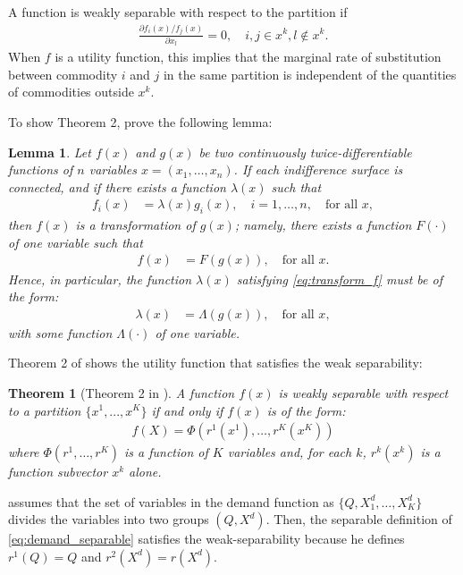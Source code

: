 \documentclass[11pt, a4paper]{article}
\newtheorem{theorem}{Theorem}
\newtheorem{lemma}{Lemma}
\theoremstyle{remark}
\begin{document}
A function is weakly separable with respect to the partition if 
\begin{align}
    \frac{\partial f_i(x)/ f_j(x)}{\partial x_l} = 0, \quad i,j\in x^k, l \notin x^k.
\end{align}
When $f$ is a utility function, this implies that the marginal rate of substitution between commodity $i$ and $j$ in the same partition is independent of the quantities of commodities outside $x^k$.

To show Theorem 2, \citet{goldmanNote1964} prove the following lemma:
\begin{lemma}\label{lemma_1_GU}
    Let $f(x)$ and $g(x)$ be two continuously twice-differentiable functions of $n$ variables $x=(x_1, \dots, x_n)$. If each indifference surface is connected, and if there exists a function $\lambda(x)$ such that
    \begin{align}
    f_i(x) &= \lambda(x)g_i(x), \quad i=1, \dots, n, \quad \text{for all } x, \label{eq:transform_f}
    \end{align}
    then $f(x)$ is a transformation of $g(x)$; namely, there exists a function $F(\cdot)$ of one variable such that
    \begin{align}
    f(x) &= F(g(x)), \quad \text{for all } x.
    \end{align}
    Hence, in particular, the function $\lambda(x)$ satisfying \eqref{eq:transform_f} must be of the form:
    \begin{align}
        \lambda(x) &= \Lambda(g(x)), \quad \text{for all } x,
    \end{align}
    with some function $\Lambda(\cdot)$ of one variable.
\end{lemma}

Theorem 2 of \citet{goldmanNote1964} shows the utility function that satisfies the weak separability:
\begin{theorem}[Theorem 2 in \citet{goldmanNote1964}]\label{thorem_2_GU}
    A function $f(x)$ is weakly separable with respect to a partition $\{x^1, .. ., x^K\}$ if and only if $f(x)$ is of the form: 
    \begin{align}
        f(X) = \Phi(r^1(x^{1}),\ldots, r^K(x^{K})   )
    \end{align} where $\Phi(r^1,\ldots, r^K)$ is a function of $K$ variables and, for each $k$, $r^k(x^{k})$ is a function subvector $x^{k}$ alone.
\end{theorem}

\citet{lau1982identifying} assumes that the set of variables in the demand function as  $\{Q, X_{1}^{d},\ldots, X_{K}^{d}\}$  divides the variables into two groups $(Q, X^{d})$.
Then, the separable definition of \eqref{eq:demand_separable} satisfies the weak-separability because he defines $r^1(Q) = Q$ and $r^2(X^d) = r(X^d)$.
\end{document}
